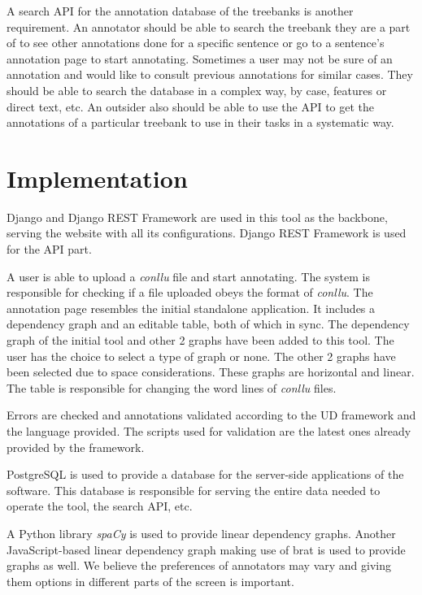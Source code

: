 \documentclass[
]{ceurart}
\begin{document}
A search API for the annotation database of the treebanks is another requirement.
An annotator should be able to search the treebank they are a part of to see other annotations done for a specific sentence or go to a sentence's annotation page to start annotating.
Sometimes a user may not be sure of an annotation and would like to consult previous annotations for similar cases.
They should be able to search the database in a complex way, by case, features or direct text, etc.
An outsider also should be able to use the API to get the annotations of a particular treebank to use in their tasks in a systematic way.

\section{Implementation}

Django\cite{django} and Django REST Framework\cite{drf} are used in this tool as the backbone, serving the website with all its configurations.
Django REST Framework is used for the API part.

A user is able to upload a \textit{conllu} file and start annotating.
The system is responsible for checking if a file uploaded obeys the format of \textit{conllu}.
The annotation page resembles the initial standalone application.
It includes a dependency graph and an editable table, both of which in sync.
The dependency graph of the initial tool and other 2 graphs have been added to this tool.
The user has the choice to select a type of graph or none.
The other 2 graphs have been selected due to space considerations.
These graphs are horizontal and linear.
The table is responsible for changing the word lines of \textit{conllu} files.

Errors are checked and annotations validated according to the UD framework and the language provided.
The scripts used for validation are the latest ones already provided by the framework.\cite{UD-git}

PostgreSQL\cite{psql} is used to provide a database for the server-side applications of the software.
This database is responsible for serving the entire data needed to operate the tool, the search API, etc.

A Python library \textit{spaCy}\cite{spacy} is used to provide linear dependency graphs.
Another JavaScript-based linear dependency graph\cite{spyssalo} making use of brat\cite{brat-vis} is used to provide graphs as well.
We believe the preferences of annotators may vary and giving them options in different parts of the screen is important.
\end{document}
